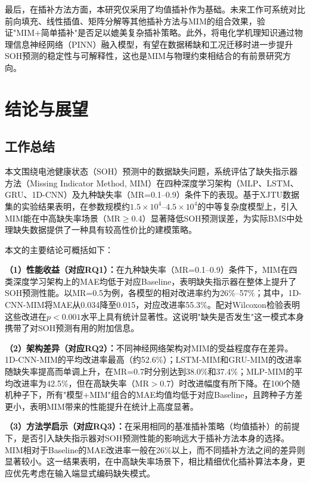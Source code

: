 \documentclass[10pt,a4paper]{ctexart}
\begin{document}
最后，在插补方法方面，本研究仅采用了均值插补作为基础。未来工作可系统对比前向填充、线性插值、矩阵分解等其他插补方法与MIM的组合效果，验证"MIM+简单插补"是否足以媲美复杂插补策略。此外，将电化学机理知识通过物理信息神经网络（PINN）融入模型，有望在数据稀缺和工况迁移时进一步提升SOH预测的稳定性与可解释性\cite{wang2024pinn}，这也是MIM与物理约束相结合的有前景研究方向。

\section{结论与展望}\label{sec:conclusion}

\subsection{工作总结}

本文围绕电池健康状态（SOH）预测中的数据缺失问题，系统评估了缺失指示器方法（Missing Indicator Method, MIM）在四种深度学习架构（MLP、LSTM、GRU、1D-CNN）及九种缺失率（MR=0.1--0.9）条件下的表现。基于XJTU数据集的实验结果表明，在参数规模约$1.5\times 10^4$--$4.5\times 10^4$的中等复杂度模型上，引入MIM能在中高缺失率场景（MR$\geq$0.4）显著降低SOH预测误差，为实际BMS中处理缺失数据提供了一种具有较高性价比的建模策略。

本文的主要结论可概括如下：

\textbf{（1）性能收益（对应RQ1）：}在九种缺失率（MR=0.1--0.9）条件下，MIM在四类深度学习架构上的MAE均低于对应Baseline，表明缺失指示器在整体上提升了SOH预测性能。以MR=0.5为例，各模型的相对改进率约为26\%--57\%；其中，1D-CNN-MIM将MAE从0.034降至0.015，对应改进率55.3\%。配对Wilcoxon检验表明这些改进在$p<0.001$水平上具有统计显著性。这说明"缺失是否发生"这一模式本身携带了对SOH预测有用的附加信息。

\textbf{（2）架构差异（对应RQ2）：}不同神经网络架构对MIM的受益程度存在差异。1D-CNN-MIM的平均改进率最高（约52.6\%）；LSTM-MIM和GRU-MIM的改进率随缺失率提高而单调上升，在MR=0.7时分别达到38.0\%和37.4\%；MLP-MIM的平均改进率为42.5\%，但在高缺失率（MR$>$0.7）时改进幅度有所下降。在100个随机种子下，所有"模型+MIM"组合的MAE均值均低于对应Baseline，且跨种子方差更小，表明MIM带来的性能提升在统计上高度显著。

\textbf{（3）方法学启示（对应RQ3）：}在采用相同的基准插补策略（均值插补）的前提下，是否引入缺失指示器对SOH预测性能的影响远大于插补方法本身的选择。MIM相对于Baseline的MAE改进率一般在26\%以上，而不同插补方法之间的差异则显著较小。这一结果表明，在中高缺失率场景下，相比精细优化插补算法本身，更应优先考虑在输入端显式编码缺失模式。
\end{document}
